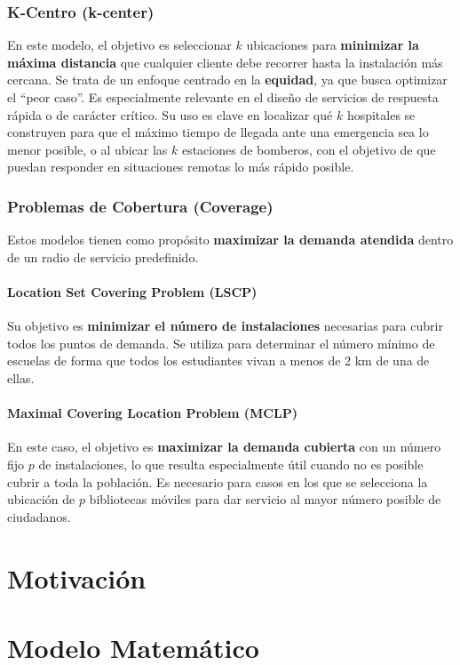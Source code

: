 \documentclass[12pt,a4paper]{book}
\begin{document}
\subsubsection{K-Centro (k-center)}
En este modelo, el objetivo es seleccionar $k$ ubicaciones para \textbf{minimizar la máxima distancia} que cualquier cliente debe recorrer hasta la instalación más cercana. Se trata de un enfoque centrado en la \textbf{equidad}, ya que busca optimizar el ``peor caso''. Es especialmente relevante en el diseño de servicios de respuesta rápida o de carácter crítico.
Su uso es clave en localizar qué $k$ hospitales se construyen para que el máximo tiempo de llegada ante una emergencia sea lo menor posible, o al ubicar las $k$ estaciones de bomberos, con el objetivo de que puedan responder
en situaciones remotas lo más rápido posible.

\subsubsection{Problemas de Cobertura (Coverage)}
Estos modelos tienen como propósito \textbf{maximizar la demanda atendida} dentro de un radio de servicio predefinido.

\paragraph{Location Set Covering Problem (LSCP)}
Su objetivo es \textbf{minimizar el número de instalaciones} necesarias para cubrir todos los puntos de demanda.
Se utiliza para determinar el número mínimo de escuelas de forma que todos los estudiantes vivan a menos de 2 km de una de ellas.


\paragraph{Maximal Covering Location Problem (MCLP)}
En este caso, el objetivo es \textbf{maximizar la demanda cubierta} con un número fijo $p$ de instalaciones, lo que resulta especialmente útil cuando no es posible cubrir a toda la población.
Es necesario para casos en los que se selecciona la ubicación de $p$ bibliotecas móviles para dar servicio al mayor número posible de ciudadanos.



\section{Motivación}

\section{Modelo Matemático}
\end{document}
